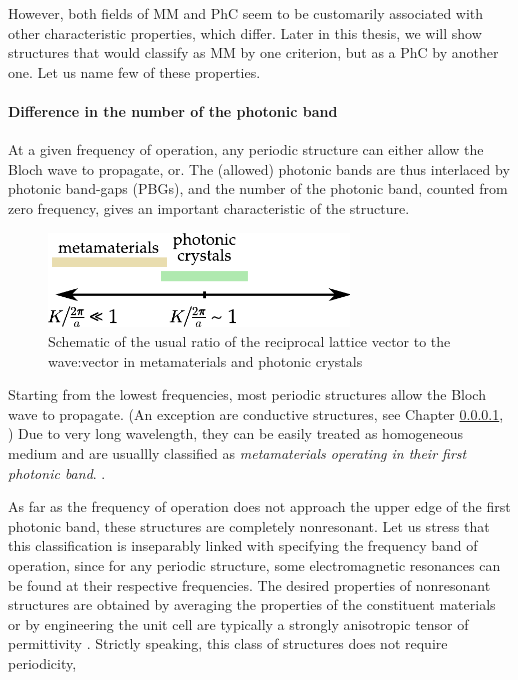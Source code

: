 However, both fields of MM and PhC seem to be customarily associated with other characteristic properties, which differ. Later in this thesis, we will show structures that would classify as  MM by one criterion, but as a PhC by another one. Let us name few of these properties.

\paragraph{Difference in the number of the photonic band}%
At a given frequency of operation, any periodic structure can either allow the Bloch wave to propagate, or. The (allowed) photonic bands are thus interlaced by photonic band-gaps (PBGs), and the number of the photonic band, counted from zero frequency, gives an important characteristic of the structure.

\begin{figure}[h] \caption{Schematic of the usual ratio of the reciprocal lattice vector to the wave:vector in metamaterials and photonic crystals}  \centering \includegraphics[width=8cm]{img/mm-phc-diagram.pdf} \end{figure} 

	Starting from the lowest frequencies, most periodic structures allow the Bloch wave to propagate. (An exception are conductive structures, see Chapter \ref{}, )  Due to very long wavelength, they can be easily treated as homogeneous medium and are usuallly classified as \textit{metamaterials operating in their first photonic band}.     
\cite{richter1995, kadlec2008, sibik2010dp}.

As far as the frequency of operation does not approach the upper edge of the first photonic band, these structures are completely nonresonant.  Let us stress that this classification is inseparably linked with specifying the frequency band of operation, since for any periodic structure, some electromagnetic resonances can be found at their respective frequencies.
The desired properties of nonresonant structures are obtained by averaging the properties of the constituent materials \cite{oganisian2014observation} or by engineering the unit cell are typically a strongly anisotropic tensor of permittivity \cite{kadlec2008, sibik2010dp}. Strictly speaking, this class of structures does not require periodicity, 

